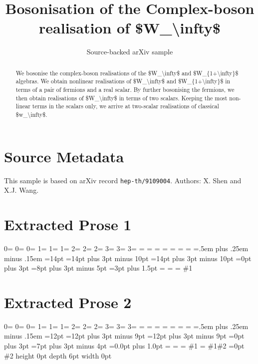 \documentclass[11pt]{article}
\title{Bosonisation of the Complex-boson realisation of \$W\_\textbackslash{}infty\$}
\author{Source-backed arXiv sample}
\date{}
\begin{document}
\maketitle
\begin{abstract}
We bosonise the complex-boson realisations of the \$W\_\textbackslash{}infty\$ and \$W\_\{1+\textbackslash{}infty\}\$ algebras. We obtain nonlinear realisations of \$W\_\textbackslash{}infty\$ and \$W\_\{1+\textbackslash{}infty\}\$ in terms of a pair of fermions and a real scalar. By further bosonising the fermions, we then obtain realisations of \$W\_\textbackslash{}infty\$ in terms of two scalars. Keeping the most non-linear terms in the scalars only, we arrive at two-scalar realisations of classical \$w\_\textbackslash{}infty\$.
\end{abstract}
\section{Source Metadata}
This sample is based on arXiv record \texttt{hep-th/9109004}. Authors: X. Shen and X.J. Wang.
\section{Extracted Prose 1}
0= 0= 0= 1= 1= 1= 2= 2= 2= 3= 3= 3= = = = = = = = =.5em plus .25em minus .15em =14pt =14pt plus 3pt minus 10pt =14pt plus 3pt minus 10pt =0pt plus 3pt =8pt plus 3pt minus 5pt =3pt plus 1.5pt = = = \#1
\section{Extracted Prose 2}
0= 0= 0= 1= 1= 1= 2= 2= 2= 3= 3= 3= = = = = = = = =.5em plus .25em minus .15em =12pt =12pt plus 3pt minus 9pt =12pt plus 3pt minus 9pt =0pt plus 3pt =7pt plus 3pt minus 4pt =0.0pt plus 1.0pt = = = \#1 = \#1\#2 =0pt \#2 height 0pt depth 6pt width 0pt
\end{document}

